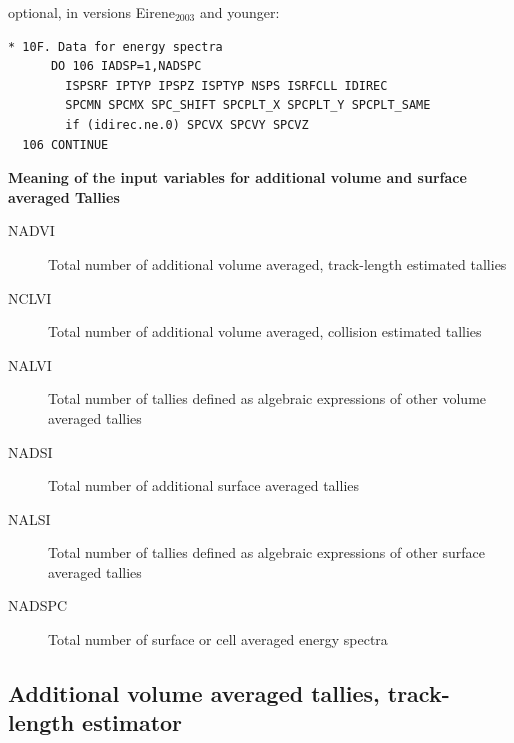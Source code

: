 optional, in versions Eirene$_{2003}$ and younger:

\begin{lstlisting}
* 10F. Data for energy spectra
      DO 106 IADSP=1,NADSPC
        ISPSRF IPTYP IPSPZ ISPTYP NSPS ISRFCLL IDIREC
        SPCMN SPCMX SPC_SHIFT SPCPLT_X SPCPLT_Y SPCPLT_SAME
        if (idirec.ne.0) SPCVX SPCVY SPCVZ
  106 CONTINUE
\end{lstlisting}

\textbf{Meaning of the input variables for additional volume and surface averaged Tallies} 

\medskip 

\begin{description}
  \item[NADVI] Total number of additional volume averaged,
        track-length estimated tallies
  \item[NCLVI] Total number of additional volume
        averaged, collision estimated tallies
  \item[NALVI] Total number of tallies
        defined as algebraic expressions of other volume averaged tallies
  \item[NADSI]
        Total number of additional surface averaged tallies
  \item[NALSI] Total number
        of tallies defined as algebraic expressions of other surface averaged tallies
  \item[NADSPC] Total number of surface or cell averaged energy spectra
\end{description}

\subsection{Additional volume averaged tallies, track-length estimator}\label{sec2.10A} 

